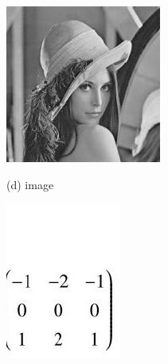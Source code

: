 \documentclass[10pt]{article}
\begin{document}
\includegraphics[max width=\textwidth]{2022_01_06_b5ce182ed1bd5f482e5bg-17(2)}

(d) image

\includegraphics[max width=\textwidth]{2022_01_06_b5ce182ed1bd5f482e5bg-17(3)}
\end{document}
